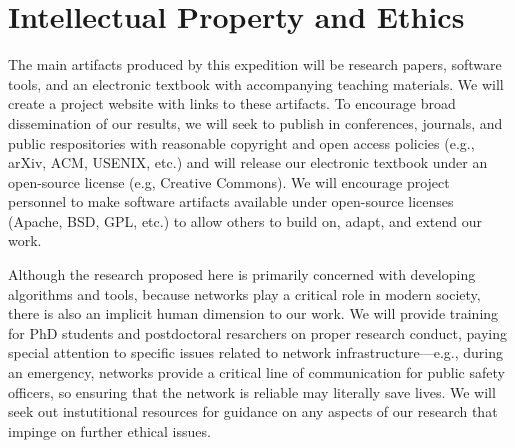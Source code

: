 \section{Intellectual Property and Ethics}

The main artifacts produced by this expedition will be research
papers, software tools, and an electronic textbook with accompanying
teaching materials. We will create a project website with links to
these artifacts. To encourage broad dissemination of our results, we
will seek to publish in conferences, journals, and public
respositories with reasonable copyright and open access policies
(e.g., arXiv, ACM, USENIX, etc.) and will release our electronic
textbook under an open-source license (e.g, Creative Commons). We will
encourage project personnel to make software artifacts available under
open-source licenses (Apache, BSD, GPL, etc.) to allow others to build
on, adapt, and extend our work.

Although the research proposed here is primarily concerned with
developing algorithms and tools, because networks play a critical role
in modern society, there is also an implicit human dimension to our
work. We will provide training for PhD students and postdoctoral
resarchers on proper research conduct, paying special attention to
specific issues related to network infrastructure---e.g., during an
emergency, networks provide a critical line of communication for
public safety officers, so ensuring that the network is reliable may
literally save lives. We will seek out instutitional resources for
guidance on any aspects of our research that impinge on further
ethical issues.
